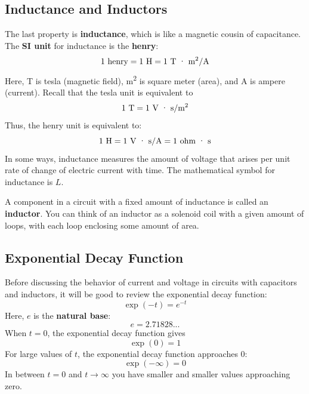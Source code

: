 \subsection{Inductance and Inductors}
%
The last property is \textbf{inductance}, which is like a magnetic cousin of capacitance. The \textbf{SI unit} for inductance is the \textbf{henry}:
\begin{equation}
	1 \ \text{henry} = 1 \ \text{H} = 1 \ \text{T{ }\textperiodcentered{ }m\textsuperscript{2}/A}
\end{equation}
Here, T is tesla (magnetic field), m\textsuperscript{2} is square meter (area), and A is ampere (current). Recall that the tesla unit is equivalent to
\begin{equation}
    1 \ \text{T} = 1 \ \text{V{ }\textperiodcentered{ }s/m\textsuperscript{2}}
\end{equation}
Thus, the henry unit is equivalent to:
\begin{equation}
    1 \ \text{H} = 1 \ \text{V{ }\textperiodcentered{ }s/A} = 1 \ \text{ohm{ }\textperiodcentered{ }s}
\end{equation}
In some ways, inductance measures the amount of voltage that arises per unit rate of change of electric current with time. The mathematical symbol for inductance is $L$.

A component in a circuit with a fixed amount of inductance is called an \textbf{inductor}. You can think of an inductor as a solenoid coil with a given amount of loops, with each loop enclosing some amount of area.
%
\subsection{Exponential Decay Function}
%
Before discussing the behavior of current and voltage in circuits with capacitors and inductors, it will be good to review the exponential decay function:
\begin{equation}
    \exp(-t) = e^{-t}
\end{equation}
Here, $e$ is the \textbf{natural base}:
\begin{equation}
    e = 2.71828...
\end{equation}
When $t = 0$, the exponential decay function gives
\begin{equation}
    \exp(0) = 1
\end{equation}
For large values of $t$, the exponential decay function approaches 0:
\begin{equation}
    \exp(-\infty) = 0
\end{equation}
In between $t = 0$ and $t \rightarrow \infty$ you have smaller and smaller values approaching zero.

